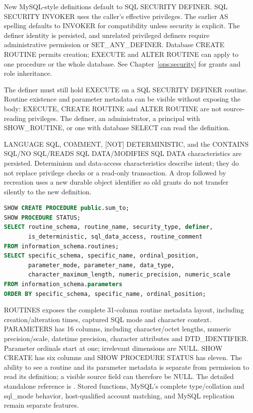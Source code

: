 New MySQL-style definitions default to SQL SECURITY DEFINER. SQL SECURITY
INVOKER uses the caller's effective privileges. The earlier AS spelling defaults
to INVOKER for compatibility unless security is explicit. The definer identity
is persisted, and unrelated privileged definers require administrative
permission or SET\_ANY\_DEFINER. Database CREATE ROUTINE permits creation; EXECUTE and ALTER ROUTINE
can apply to one procedure or the whole database. See Chapter~\ref{ops:security}
for grants and role inheritance.

The definer must still hold EXECUTE on a SQL SECURITY DEFINER routine.
Routine existence and parameter metadata can be visible without exposing
the body: EXECUTE, CREATE ROUTINE and ALTER ROUTINE are not source-reading
privileges. The definer, an administrator, a principal with SHOW\_ROUTINE,
or one with database SELECT can read the definition.

LANGUAGE SQL, COMMENT, [NOT] DETERMINISTIC, and the CONTAINS SQL/NO SQL/READS SQL
DATA/MODIFIES SQL DATA characteristics are persisted. Determinism and data-access
characteristics describe intent; they do not replace privilege checks or a
read-only transaction. A drop followed by recreation uses a new durable object
identifier so old grants do not transfer silently to the new definition.

\begin{lstlisting}[language=SQL]
SHOW CREATE PROCEDURE public.sum_to;
SHOW PROCEDURE STATUS;
SELECT routine_schema, routine_name, security_type, definer,
       is_deterministic, sql_data_access, routine_comment
FROM information_schema.routines;
SELECT specific_schema, specific_name, ordinal_position,
       parameter_mode, parameter_name, data_type,
       character_maximum_length, numeric_precision, numeric_scale
FROM information_schema.parameters
ORDER BY specific_schema, specific_name, ordinal_position;
\end{lstlisting}

ROUTINES exposes the complete 31-column routine metadata layout, including
creation/alteration times, captured SQL mode and character context. PARAMETERS
has 16 columns, including character/octet lengths, numeric precision/scale,
datetime precision, character attributes and DTD\_IDENTIFIER. Parameter ordinals
start at one; irrelevant dimensions are NULL. SHOW CREATE has six columns and
SHOW PROCEDURE STATUS has eleven. The ability to see a routine and its parameter
metadata is separate from permission to read its definition; a visible source
field can therefore be NULL. The detailed
standalone reference is . Stored functions,
MySQL's complete type/collation and sql\_mode behavior, host-qualified account
matching, and MySQL replication remain separate features.

